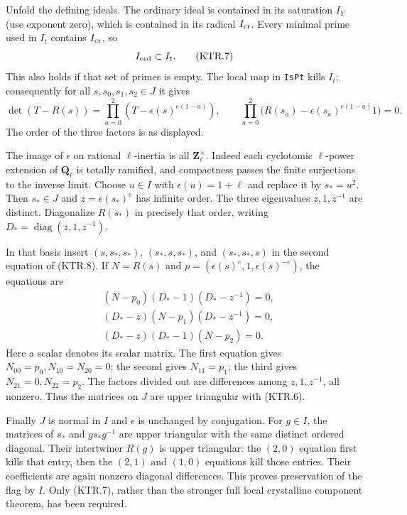 \documentclass[11pt,a4paper]{article}
\numberwithin{equation}{section}
\theoremstyle{remark}\newtheorem{remark}[theorem]{Remark}
\begin{document}
Unfold the defining ideals.  The ordinary ideal is contained in
its saturation \(I_Y\) (use exponent zero), which is contained
in its radical \(I_{\rm cr}\).  Every minimal prime used in
\(I_t\) contains \(I_{\rm cr}\), so
\[
                    I_{\rm ord}\subset I_t.
 \tag{KTR.7}
\]
This also holds if that set of primes is empty.  The local map
in \texttt{Is\allowbreak Pt} kills \(I_t\); consequently for all
\(s,s_0,s_1,s_2\in J\) it gives
\[
 \det(T-R(s))=\prod_{a=0}^2(T-\epsilon(s)^{e(1-a)}),
 \qquad
 \prod_{a=0}^2\bigl(R(s_a)-\epsilon(s_a)^{e(1-a)}1\bigr)=0.
 \tag{KTR.8}
\]
The order of the three factors is as displayed.

The image of \(\epsilon\) on rational \(\ell\)-inertia is
all \(\mathbf Z_\ell^\times\).  Indeed each cyclotomic
\(\ell\)-power extension of \(\mathbf Q_\ell\) is totally
ramified, and compactness passes the finite surjections to the
inverse limit.  Choose \(u\in I\) with
\(\epsilon(u)=1+\ell\) and replace it by \(s_*=u^2\).
Then \(s_*\in J\) and \(z=\epsilon(s_*)^e\) has infinite
order.  The three eigenvalues \(z,1,z^{-1}\) are distinct.
Diagonalize \(R(s_*)\) in precisely that order, writing
\(D_* =\operatorname{diag}(z,1,z^{-1})\).

In that basis insert \((s,s_*,s_*)\),
\((s_*,s,s_*)\), and \((s_*,s_*,s)\) in the second
equation of (KTR.8).  If \(N=R(s)\) and
\(p=(\epsilon(s)^e,1,\epsilon(s)^{-e})\), the equations are
\[
 \begin{split}
 &(N-p_0)(D_*-1)(D_*-z^{-1})=0,\\
 &(D_*-z)(N-p_1)(D_*-z^{-1})=0,\\
 &(D_*-z)(D_*-1)(N-p_2)=0.
 \end{split}
 \tag{KTR.9}
\]
Here a scalar denotes its scalar matrix.  The first equation
gives \(N_{00}=p_0,N_{10}=N_{20}=0\); the second gives
\(N_{11}=p_1\); the third gives
\(N_{21}=0,N_{22}=p_2\).  The factors divided out are
differences among \(z,1,z^{-1}\), all nonzero.  Thus the
matrices on \(J\) are upper triangular with (KTR.6).

Finally \(J\) is normal in \(I\) and \(\epsilon\) is
unchanged by conjugation.  For \(g\in I\), the matrices of
\(s_*\) and \(g s_*g^{-1}\) are upper triangular with the
same distinct ordered diagonal.  Their intertwiner \(R(g)\)
is upper triangular: the \((2,0)\) equation first kills that
entry, then the \((2,1)\) and \((1,0)\) equations kill those
entries.  Their coefficients are again nonzero diagonal
differences.  This proves preservation of the flag by \(I\).
Only (KTR.7), rather than the stronger full local crystalline
component theorem, has been required.
\end{document}
